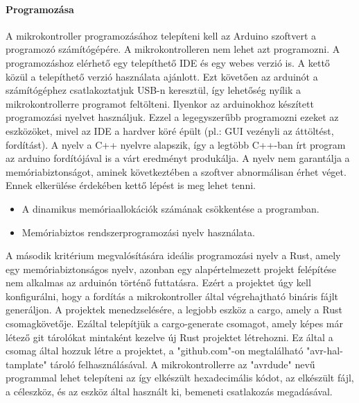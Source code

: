 \paragraph{Programozása}
A mikrokontroller programozásához telepíteni kell az Arduino szoftvert a programozó számítógépére. A mikrokontrolleren nem lehet azt programozni. A programozáshoz elérhető egy telepíthető IDE és egy webes verzió is. A kettő közül a telepíthető verzió használata ajánlott. Ezt követően az arduinót a számítógéphez csatlakoztatjuk USB-n keresztül, így lehetőség nyílik a mikrokontrollerre programot feltölteni. \cite{monk2023programming} Ilyenkor az arduinokhoz készített programozási nyelvet használjuk. Ezzel a legegyszerűbb programozni ezeket az eszközöket, mivel az IDE a hardver köré épült (pl.: GUI vezényli az áttöltést, fordítást). A nyelv a C++ nyelvre alapszik, így a legtöbb C++-ban írt program az arduino fordítójával is a várt eredményt produkálja. A nyelv nem garantálja a memóriabiztonságot, aminek következtében a szoftver abnormálisan érhet véget. Ennek elkerülése érdekében kettő lépést is meg lehet tenni.
\begin{itemize}
    \item A dinamikus memóriaallokációk számának csökkentése a programban.
    \item Memóriabiztos rendszerprogramozási nyelv használata.
\end{itemize}
A második kritérium megvalósítására ideális programozási nyelv a Rust, amely egy memóriabiztonságos nyelv, azonban egy alapértelmezett projekt felépítése nem alkalmas az arduinón történő futtatásra. Ezért a projektet úgy kell konfigurálni, hogy a fordítás a mikrokontroller által végrehajtható bináris fájlt generáljon. A projektek menedzselésére, a legjobb eszköz a cargo, amely a Rust csomagkövetője\cite{cargo}. Ezáltal telepítjük a cargo-generate csomagot, amely képes már létező git tárolókat mintaként kezelve új Rust projektet létrehozni\cite{cargo-generate}. Ez által a csomag által hozzuk létre a projektet, a "github.com"-on megtalálható "avr-hal-tamplate"\cite{templates} tároló felhasználásával. A mikrokontrollerre az "avrdude" nevű programmal lehet telepíteni az így elkészült hexadecimális kódot, az elkészült fájl, a céleszköz, és az eszköz által használt ki, bemeneti csatlakozás megadásával.\cite{avrdude}

